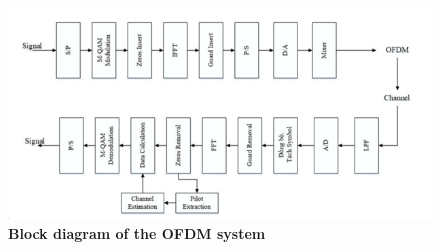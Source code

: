 \begin{figure}[htbp]
    \centering
    \includegraphics[width=\textwidth]{Figures/Block-diagram.png}
    \caption{\bfseries\centering\fontsize{13pt}{0pt}\selectfont Block diagram of the OFDM system}
    \label{Block diagram}    
\end{figure}


